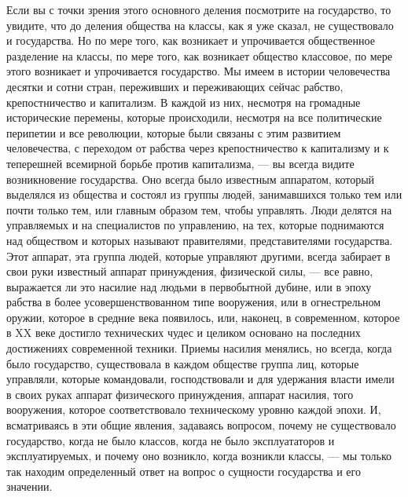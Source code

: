 \documentclass[12pt]{article}
\newcommand{\parnum}{(\arabic{parcount})}
\newcounter{parcount}
\newenvironment{parnumbers}{%
  \par%
  \everypar{\noindent \stepcounter{parcount}\marginpar[]{\parnum}}%
}{}
\begin{document}
\begin{parnumbers}
Если вы с точки зрения этого основного деления посмотрите на государство, то увидите, что до деления общества на классы, как я уже сказал, не существовало и государства. Но по мере того, как возникает и упрочивается общественное разделение на классы, по мере того, как возникает общество классовое, по мере этого возникает и упрочивается государство. Мы имеем в истории человечества десятки и сотни стран, переживших и переживающих сейчас рабство, крепостничество и капитализм. В каждой из них, несмотря на громадные исторические перемены, которые происходили, несмотря на все политические перипетии и все революции, которые были связаны с этим развитием человечества, с переходом от рабства через крепостничество к капитализму и к теперешней всемирной борьбе против капитализма, — вы всегда видите возникновение государства. Оно всегда было известным аппаратом, который выделялся из общества и состоял из группы людей, занимавшихся только тем или почти только тем, или главным образом тем, чтобы управлять. Люди делятся на управляемых и на специалистов по управлению, на тех, которые поднимаются над обществом и которых называют правителями, представителями государства. Этот аппарат, эта группа людей, которые управляют другими, всегда забирает в свои руки известный аппарат принуждения, физической силы, — все равно, выражается ли это насилие над людьми в первобытной дубине, или в эпоху рабства в более усовершенствованном типе вооружения, или в огнестрельном оружии, которое в средние века появилось, или, наконец, в современном, которое в XX веке достигло технических чудес и целиком основано на последних достижениях современной техники. Приемы насилия менялись, но всегда, когда было государство, существовала в каждом обществе группа лиц, которые управляли, которые командовали, господствовали и для удержания власти имели в своих руках аппарат физического принуждения, аппарат насилия, того вооружения, которое соответствовало техническому уровню каждой эпохи. И, всматриваясь в эти общие явления, задаваясь вопросом, почему не существовало государство, когда не было классов, когда не было эксплуататоров и эксплуатируемых, и почему оно возникло, когда возникли классы, — мы только так находим определенный ответ на вопрос о сущности государства и его значении.


\end{parnumbers}
\end{document}

